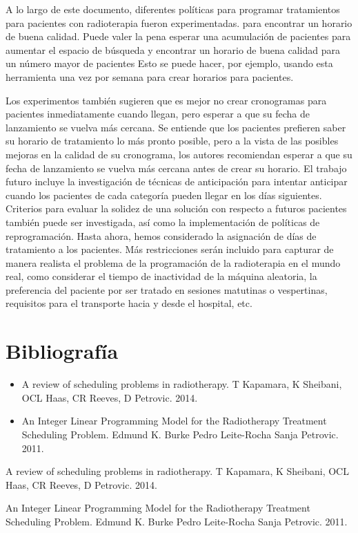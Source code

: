 \documentclass[letter, 10pt]{article}
\begin{document}
A lo largo de este documento, diferentes políticas para programar tratamientos para pacientes con radioterapia
fueron experimentadas. para encontrar un horario de buena calidad. Puede valer la pena esperar una acumulación de
pacientes para aumentar el espacio de búsqueda y encontrar un horario de buena calidad para un número mayor de pacientes Esto se puede hacer, por ejemplo, usando esta herramienta una vez por semana para crear horarios para pacientes.

Los experimentos también sugieren que es mejor no crear cronogramas para pacientes inmediatamente cuando llegan, pero esperar a que su fecha de lanzamiento se vuelva más cercana. Se entiende que los pacientes prefieren saber su horario de tratamiento lo más pronto posible, pero a la vista de las posibles mejoras
en la calidad de su cronograma, los autores recomiendan esperar a que su fecha de lanzamiento se vuelva más cercana
antes de crear su horario.
El trabajo futuro incluye la investigación de técnicas de anticipación para intentar anticipar cuando
los pacientes de cada categoría pueden llegar en los días siguientes. Criterios para evaluar la solidez de
una solución con respecto a futuros pacientes también puede ser investigada, así como la implementación de
políticas de reprogramación.
Hasta ahora, hemos considerado la asignación de días de tratamiento a los pacientes. Más restricciones serán
incluido para capturar de manera realista el problema de la programación de la radioterapia en el mundo real, como considerar
el tiempo de inactividad de la máquina aleatoria, la preferencia del paciente por ser tratado en sesiones matutinas o vespertinas,
requisitos para el transporte hacia y desde el hospital, etc.

\newpage

\section{Bibliograf\'ia}

\begin{itemize}
    \item A review of scheduling problems in radiotherapy. T Kapamara, K Sheibani, OCL Haas, CR Reeves, D Petrovic. 2014.
    \item An Integer Linear Programming Model for the Radiotherapy Treatment Scheduling Problem. Edmund K. Burke Pedro Leite-Rocha Sanja Petrovic. 2011.
\end{itemize}

\begin{thebibliography}{9}
A review of scheduling problems in radiotherapy. T Kapamara, K Sheibani, OCL Haas, CR Reeves, D Petrovic. 2014.

An Integer Linear Programming Model for the Radiotherapy Treatment Scheduling Problem. Edmund K. Burke Pedro Leite-Rocha Sanja Petrovic. 2011.
\end{thebibliography}
\end{document}
